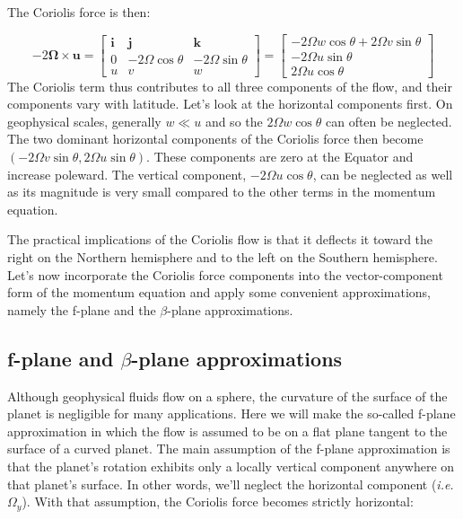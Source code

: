 \documentclass[12pt]{article}
\numberwithin{equation}{section}
\numberwithin{figure}{section}
\numberwithin{table}{section}
\begin{document}
The Coriolis force is then:

\begin{equation}
  - 2 \mathbf{\Omega} \times \mathbf{u} =
  \begin{bmatrix}
    \mathbf{i} & \mathbf{j} & \mathbf{k} \\
    0 & - 2 \Omega \cos\theta & - 2 \Omega \sin\theta \\
    u & v & w
  \end{bmatrix} =
  \begin{bmatrix}
    - 2 \Omega w \cos\theta + 2 \Omega v \sin\theta \\
    - 2 \Omega u \sin\theta \\
    2 \Omega u \cos\theta
  \end{bmatrix}
\end{equation}
The Coriolis term thus contributes to all three components of the flow, and
their components vary with latitude.
Let's look at the horizontal components first.
On geophysical scales, generally $w \ll u$ and so the $2 \Omega w \cos\theta$
can often be neglected.
The two dominant horizontal components of the Coriolis force then become
$(-2\Omega v \sin\theta, 2\Omega u \sin\theta)$.
These components are zero at the Equator and increase poleward.
The vertical component, $-2 \Omega u \cos\theta$, can be neglected as well as
its magnitude is very small compared to the other terms in the momentum
equation.

The practical implications of the Coriolis flow is that it deflects it
toward the right on the Northern hemisphere and to the left on the Southern
hemisphere.
Let's now incorporate the Coriolis force components into the vector-component
form of the momentum equation and apply some convenient approximations, namely
the f-plane and the $\beta$-plane approximations.

\subsection{f-plane and $\beta$-plane approximations}

Although geophysical fluids flow on a sphere, the curvature of the surface of
the planet is negligible for many applications.
Here we will make the so-called f-plane approximation in which the flow is
assumed to be on a flat plane tangent to the surface of a curved planet.
The main assumption of the f-plane approximation is that the planet's rotation
exhibits only a locally vertical component anywhere on that planet's surface.
In other words, we'll neglect the horizontal component (\textit{i.e.} $\Omega_y$).
With that assumption, the Coriolis force becomes strictly horizontal:
\end{document}
